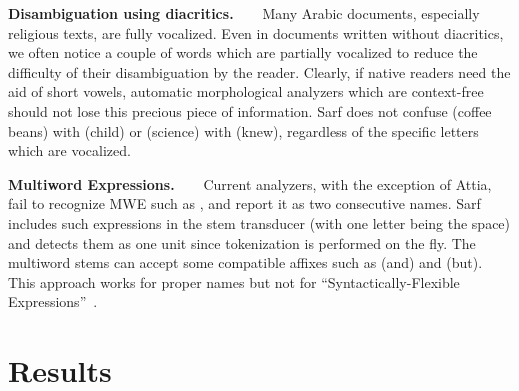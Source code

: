\documentclass[11pt]{article}
\newcommand{\noTrRL}[1]{\transfalse\RL{#1}\transtrue}
\newcommand{\noTrnoVocRL}[1]{\transfalse\novocalize\noTrRL{#1}\vocalize\transtrue}
\begin{document}
{\bf Disambiguation using diacritics.~~~}
Many Arabic documents, especially religious texts, are fully vocalized.
Even in documents written without diacritics, we often %
notice 
a couple of words which are partially vocalized
to reduce the difficulty of their disambiguation by the reader. Clearly, if native readers
need the aid of short vowels, automatic morphological analyzers which are context-free should not lose this precious piece of information.
Sarf does not confuse  (coffee beans) with  (child)
or  (science) with  (knew), regardless of the specific letters which are vocalized.


{\bf Multiword Expressions.~~~}
%
Current analyzers, with the exception of Attia, fail to recognize MWE such as \noTrnoVocRL{`bid alkarym}, and 
report it as two consecutive names. 
Sarf includes such expressions in the stem transducer (with one letter being the space) and 
detects them as one unit since tokenization
is performed on the fly. The multiword stems
can accept some compatible affixes such as  (and) and  (but).
This approach works for proper names but not for ``Syntactically-Flexible Expressions''~\cite{MWE}.

\section{Results}
\label{sec:results}
\end{document}
